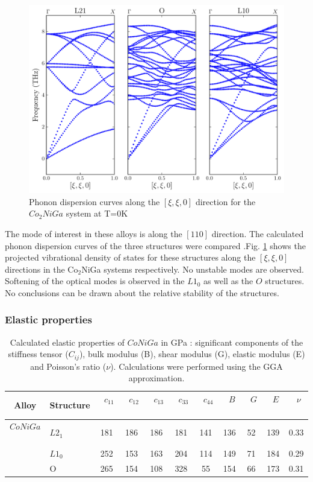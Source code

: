 \documentclass[%
preprint,
 amsmath,amssymb,
 aps,
prb,
showkeys,
]{revtex4-1}
\begin{document}
\begin{figure}
  \includegraphics[scale=0.7]{figure_7}
  \caption{Phonon dispersion curves  along the $[\xi,\xi,0] $ direction for the $Co_2NiGa$ system at T=0K }
  \label{CNG_dispersion}
\end{figure}

The mode of interest in these alloys is along the $[110]$ direction. The calculated phonon dispersion curves of the three structures were compared .Fig. \ref{CNG_dispersion}  shows the projected vibrational density of states for these structures along the $[\xi,\xi,0] $ directions in the Co$_2$NiGa  systems respectively. No unstable modes are observed. Softening of the optical modes is observed in the $L1_0$ as well as the $O$ structures. No conclusions can be drawn about the relative stability of the structures.

\subsubsection{Elastic properties}
\label{subsec:elastic}
\begin{table}
\begin{center}
\caption{Calculated elastic properties of $CoNiGa$  in GPa : significant components of the stiffness tensor ($C_{ij}$), bulk modulus (B), shear modulus (G), elastic modulus (E) and Poisson's ratio ($\nu$). Calculations were performed using the GGA\cite{Perdew1992} approximation. }
\begin{tabular}{clccccccccc}
\hline
Alloy& Structure& \ $c_{11}$ \ & \ $c_{12}$ \ & \ $c_{13}$ \ & \ $c_{33}$ \ & \ $c_{44}$ \ & \ $B$ \ & \ $G$ \ & \ $E$ \ & \ $\nu$ \ \\
\hline\hline
$CoNiGa$ \ &$L2_1$ & 181  & 186 & 186 & 181 & 141 &136  &52 &139  &0.33 \\
\vspace{0.5em}
 \ & $L1_0$ & 252 & 153 & 163 & 204 & 114 &149  &71  & 184 &0.29 \\
 \vspace{0.5em}
 \ & O & 265 & 154 &108 & 328 & 55  &154  &66  &173  &0.31 \\
\hline
\end{tabular}
\label{tab:elastic}
\end{center}
\end{table}
\end{document}

